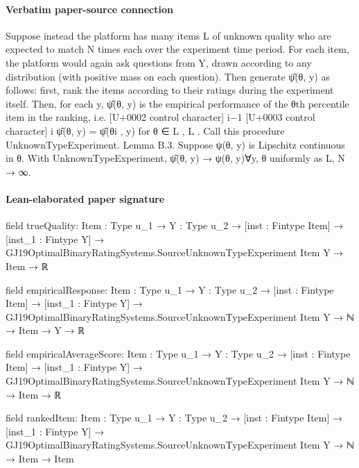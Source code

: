 \documentclass[10pt]{article}
\begin{document}
\paragraph{Verbatim paper-source connection}
\begin{ReviewVerbatim}
Suppose instead the platform has many items L of unknown quality who are expected to match N
times each over the experiment time period. For each item, the platform would again ask questions
from Y, drawn according to any distribution (with positive mass on each question). Then generate
ψ̂(θ, y) as follows: first, rank the items according to their ratings during the experiment itself.
Then, for each y, ψ̂(θ, y) is
the empirical
performance of the θth percentile item in the ranking, i.e.
[U+0002 control character] i−1
[U+0003 control character]
i
ψ̂(θ, y) = ψ̂(θi , y) for θ ∈ L , L . Call this procedure UnknownTypeExperiment.
Lemma B.3. Suppose ψ(θ, y) is Lipschitz continuous in θ. With UnknownTypeExperiment, ψ̂(θ, y) →
ψ(θ, y)∀y, θ uniformly as L, N → ∞.
\end{ReviewVerbatim}



\paragraph{Lean-elaborated paper signature}
\begin{ReviewVerbatim}
field trueQuality:
{Item : Type u_1} →
  {Y : Type u_2} →
    [inst : Fintype Item] →
      [inst_1 : Fintype Y] → GJ19OptimalBinaryRatingSystems.SourceUnknownTypeExperiment Item Y → Item → ℝ

field empiricalResponse:
{Item : Type u_1} →
  {Y : Type u_2} →
    [inst : Fintype Item] →
      [inst_1 : Fintype Y] → GJ19OptimalBinaryRatingSystems.SourceUnknownTypeExperiment Item Y → ℕ → Item → Y → ℝ

field empiricalAverageScore:
{Item : Type u_1} →
  {Y : Type u_2} →
    [inst : Fintype Item] →
      [inst_1 : Fintype Y] → GJ19OptimalBinaryRatingSystems.SourceUnknownTypeExperiment Item Y → ℕ → Item → ℝ

field rankedItem:
{Item : Type u_1} →
  {Y : Type u_2} →
    [inst : Fintype Item] →
      [inst_1 : Fintype Y] → GJ19OptimalBinaryRatingSystems.SourceUnknownTypeExperiment Item Y → ℕ → Item → Item
\end{ReviewVerbatim}
\end{document}
